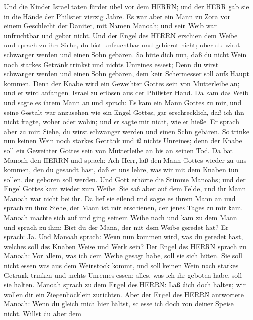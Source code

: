  Und die Kinder Israel taten fürder übel vor dem HERRN; und
der HERR gab sie in die Hände der Philister vierzig Jahre. 
Es war aber ein Mann zu Zora von einem Geschlecht der Daniter, mit Namen
Manoah; und sein Weib war unfruchtbar und gebar nicht.  Und
der Engel des HERRN erschien dem Weibe und sprach zu ihr: Siehe, du bist
unfruchtbar und gebierst nicht; aber du wirst schwanger werden und einen
Sohn gebären.  So hüte dich nun, daß du nicht Wein noch
starkes Getränk trinkst und nichts Unreines essest;  Denn du
wirst schwanger werden und einen Sohn gebären, dem kein Schermesser soll
aufs Haupt kommen. Denn der Knabe wird ein Geweihter Gottes sein von
Mutterleibe an; und er wird anfangen, Israel zu erlösen aus der
Philister Hand.  Da kam das Weib und sagte es ihrem Mann an
und sprach: Es kam ein Mann Gottes zu mir, und seine Gestalt war
anzusehen wie ein Engel Gottes, gar erschrecklich, daß ich ihn nicht
fragte, woher oder wohin; und er sagte mir nicht, wie er hieße.
 Er sprach aber zu mir: Siehe, du wirst schwanger werden und
einen Sohn gebären. So trinke nun keinen Wein noch starkes Getränk und
iß nichts Unreines; denn der Knabe soll ein Geweihter Gottes sein von
Mutterleibe an bis an seinen Tod.  Da bat Manoah den HERRN
und sprach: Ach Herr, laß den Mann Gottes wieder zu uns kommen, den du
gesandt hast, daß er uns lehre, was wir mit dem Knaben tun sollen, der
geboren soll werden.  Und Gott erhörte die Stimme Manoahs;
und der Engel Gottes kam wieder zum Weibe. Sie saß aber auf dem Felde,
und ihr Mann Manoah war nicht bei ihr.  Da lief sie eilend
und sagte es ihrem Mann an und sprach zu ihm: Siehe, der Mann ist mir
erschienen, der jenes Tages zu mir kam.  Manoah machte sich
auf und ging seinem Weibe nach und kam zu dem Mann und sprach zu ihm:
Bist du der Mann, der mit dem Weibe geredet hat? Er sprach: Ja.
 Und Manoah sprach: Wenn nun kommen wird, was du geredet
hast, welches soll des Knaben Weise und Werk sein?  Der
Engel des HERRN sprach zu Manoah: Vor allem, was ich dem Weibe gesagt
habe, soll sie sich hüten.  Sie soll nicht essen was aus
dem Weinstock kommt, und soll keinen Wein noch starkes Getränk trinken
und nichts Unreines essen; alles, was ich ihr geboten habe, soll sie
halten.  Manoah sprach zu dem Engel des HERRN: Laß dich
doch halten; wir wollen dir ein Ziegenböcklein zurichten. 
Aber der Engel des HERRN antwortete Manoah: Wenn du gleich mich hier
hältst, so esse ich doch von deiner Speise nicht. Willst du aber dem
